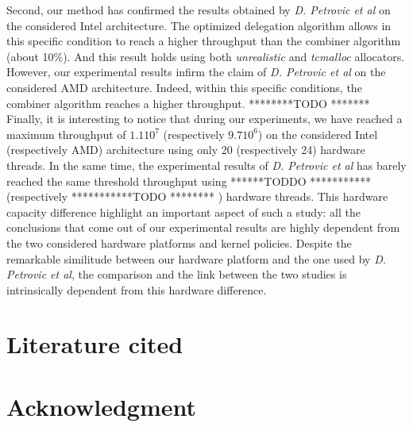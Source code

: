 \documentclass[10pt]{article}											%
\begin{document}
Second, our method has confirmed the results obtained by \emph{D. Petrovic et al} \cite{delegationCS_roparsPetrovic} on the considered Intel architecture.   The optimized delegation algorithm allows in this specific condition to reach a higher throughput than the combiner algorithm (about 10\%).  And this result holds using both \textit{unrealistic} and \textit{tcmalloc} allocators.\\
However, our experimental results infirm the claim of \emph{D. Petrovic et al} \cite{delegationCS_roparsPetrovic} on the considered AMD architecture.   Indeed, within this specific conditions, the combiner algorithm reaches a higher throughput.   ********TODO *******\\

Finally, it is interesting to notice that during our experiments, we have reached a maximum throughput of $1.1 10^7$ (respectively $9.7 10^6$) on the considered Intel (respectively AMD) architecture using only 20 (respectively 24) hardware threads.   In the same time, the experimental results of \emph{D. Petrovic et al} has barely reached the same threshold throughput using ******TODDO *********** (respectively ***********TODO ******** ) hardware threads.   This hardware capacity difference highlight an important aspect of such a study:   all the conclusions that come out of our experimental results are highly dependent from the two considered hardware platforms and kernel policies.   Despite the remarkable similitude between our hardware platform and the one used by \emph{D. Petrovic et al}, the comparison and the link between the two studies is intrinsically dependent from this hardware difference.



\section{Literature cited}

\nocite{*}
\small{
\vspace{0.75in}}





\section{Acknowledgment}
\end{document}
